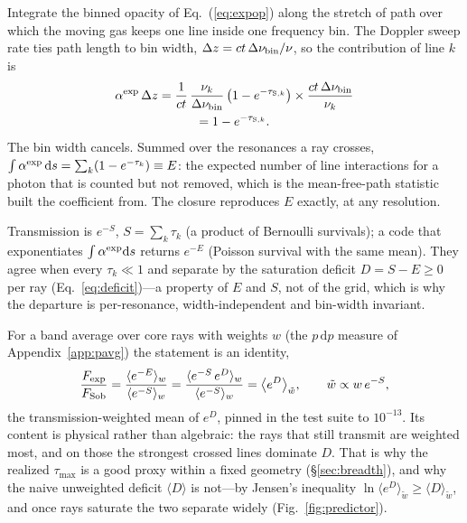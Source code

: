 \documentclass[fleqn,usenatbib]{mnras}
\begin{document}
Integrate the binned opacity of Eq.~(\ref{eq:expop}) along the stretch of
path over which the moving gas keeps one line inside one frequency bin.
The Doppler sweep rate ties path length to bin width,
$\Delta z = ct\,\Delta\nu_{\rm bin}/\nu$, so the contribution of line $k$ is
\begin{multline}
  \alpha^{\rm exp}\,\Delta z
  = \frac{1}{ct}\,\frac{\nu_k}{\Delta\nu_{\rm bin}}
    \left(1-e^{-\tau_{{\rm S},k}}\right)
    \times \frac{ct\,\Delta\nu_{\rm bin}}{\nu_k} \\
  = 1-e^{-\tau_{{\rm S},k}} .
\end{multline}
The bin width cancels. Summed over the resonances a ray crosses,
$\int\alpha^{\rm exp}\,\mathrm{d}s = \sum_k(1-e^{-\tau_k}) \equiv E$: the
expected number of line interactions for a photon that is counted but not
removed, which is the mean-free-path statistic \citet{karp1977} built the
coefficient from. The closure reproduces $E$ exactly, at any resolution.

Transmission is $e^{-S}$, $S=\sum_k\tau_k$ (a product of Bernoulli
survivals); a code that exponentiates $\int\alpha^{\rm exp}\mathrm{d}s$ returns
$e^{-E}$ (Poisson survival with the same mean). They agree when every
$\tau_k\ll1$ and separate by the saturation deficit $D=S-E\ge0$ per ray
(Eq.~\ref{eq:deficit})---a property of $E$ and $S$, not of the grid, which is
why the departure is per-resonance, width-independent and bin-width
invariant.

For a band average over core rays with weights $w$ (the $p\,\mathrm{d}p$
measure of Appendix~\ref{app:pavg}) the statement is an identity,
\begin{equation}
  \frac{F_{\rm exp}}{F_{\rm Sob}}
  = \frac{\langle e^{-E}\rangle_w}{\langle e^{-S}\rangle_w}
  = \frac{\langle e^{-S}\,e^{D}\rangle_w}{\langle e^{-S}\rangle_w}
  = \bigl\langle e^{D}\bigr\rangle_{\tilde w},\qquad \tilde w \propto w\,e^{-S},
  \label{eq:identity}
\end{equation}
the transmission-weighted mean of $e^{D}$, pinned in the test suite to
$10^{-13}$. Its content is physical rather than algebraic: the rays that
still transmit are weighted most, and on those the strongest crossed lines
dominate $D$. That is why the realized $\tau_{\max}$ is a good proxy within a
fixed geometry (\S\ref{sec:breadth}), and why the naive unweighted deficit
$\langle D\rangle$ is not---by Jensen's inequality
$\ln\langle e^{D}\rangle_{\tilde w}\ge\langle D\rangle_{\tilde w}$, and once rays
saturate the two separate widely (Fig.~\ref{fig:predictor}).
\end{document}
